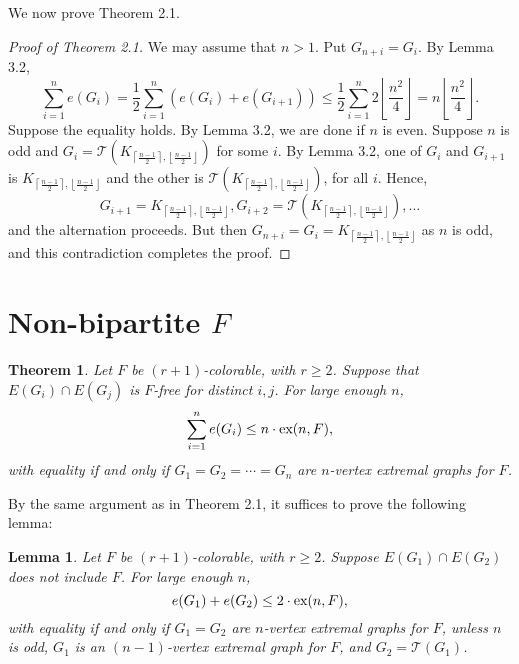 \documentclass[12pt]{report}
\newtheorem{theorem}{Theorem}[chapter]
\newtheorem{lemma}{Lemma}[theorem]
\begin{document}
We now prove Theorem 2.1.

\begin{proof}[Proof of Theorem 2.1]
  We may assume that $n > 1$. Put $G_{n + i} = G_i$. By Lemma 3.2,
  \[
    \sum_{i = 1}^n e(G_i) = \frac{1}{2}\sum_{i = 1}^n (e(G_i) + e(G_{i + 1})) \leq \frac{1}{2}\sum_{i = 1}^n 2\left\lfloor\frac{n^2}{4}\right\rfloor = n\left\lfloor\frac{n^2}{4}\right\rfloor.
  \]
  Suppose the equality holds. By Lemma 3.2, we are done if $n$ is even. Suppose $n$ is odd and $G_i
   = \mathcal{T}(K_{\left\lceil\frac{n - 1}{2}\right\rceil, \left\lfloor\frac{n -
   1}{2}\right\rfloor})$ for some $i$. By Lemma 3.2, one of $G_i$ and $G_{i + 1}$ is
   $K_{\left\lceil\frac{n - 1}{2}\right\rceil, \left\lfloor\frac{n - 1}{2}\right\rfloor}$ and the
   other is $\mathcal{T}(K_{\left\lceil\frac{n - 1}{2}\right\rceil, \left\lfloor\frac{n -
   1}{2}\right\rfloor})$, for all $i$. Hence,
   \[
    G_{i + 1} = K_{\left\lceil\frac{n - 1}{2}\right\rceil, \left\lfloor\frac{n - 1}{2}\right\rfloor}, G_{i + 2} = \mathcal{T}(K_{\left\lceil\frac{n - 1}{2}\right\rceil, \left\lfloor\frac{n - 1}{2}\right\rfloor}), \ldots
   \]
   and the alternation proceeds. But then $G_{n + i} = G_i =
   K_{\left\lceil\frac{n - 1}{2}\right\rceil, \left\lfloor\frac{n - 1}{2}\right\rfloor}$ as $n$ is
   odd, and this contradiction completes the proof.
\end{proof}

\section{Non-bipartite $F$}

\begin{theorem}
  Let $F$ be $(r + 1)$-colorable, with $r \geq 2$. Suppose that $E(G_i) \cap E(G_j)$ is $F$-free for
  distinct $i, j$. For large enough $n$,
  \[
    \sum_{i = 1}^n e(G_i) \leq n \cdot \textnormal{ex}(n, F),
  \]
  with equality if and only if $G_1 = G_2 = \cdots = G_n$ are $n$-vertex extremal graphs for $F$.
\end{theorem}

By the same argument as in Theorem 2.1, it suffices to prove the following lemma:

\begin{lemma}
  Let $F$ be $(r + 1)$-colorable, with $r \geq 2$. Suppose $E(G_1) \cap E(G_2)$ does not include
  $F$. For large enough $n$,
  \[
    e(G_1) + e(G_2) \leq 2 \cdot \textnormal{ex}(n, F),
  \]
  with equality if and only if $G_1 = G_2$ are $n$-vertex extremal graphs for $F$, unless $n$ is
  odd, $G_1$ is an $(n - 1)$-vertex extremal graph for $F$, and $G_2 = \mathcal{T}(G_1)$. 
\end{lemma}
\end{document}
